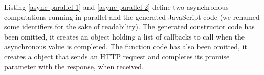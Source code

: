 \documentclass[american,english,runningheads]{llncs}
\begin{document}
Listing \ref{async-parallel-1} and \ref{async-parallel-2} define two asynchronous computations running in parallel
and the generated JavaScript code (we renamed some identifiers for the sake of readability). The generated
 constructor code has been omitted, it creates an object holding a list of callbacks to call when the
asynchronous value is completed. The  function code has also been omitted, it creates a
 object that sends an HTTP request and completes its promise parameter with the response, when
received.

% 
% 
% 
% 
% 
% 
\end{document}
